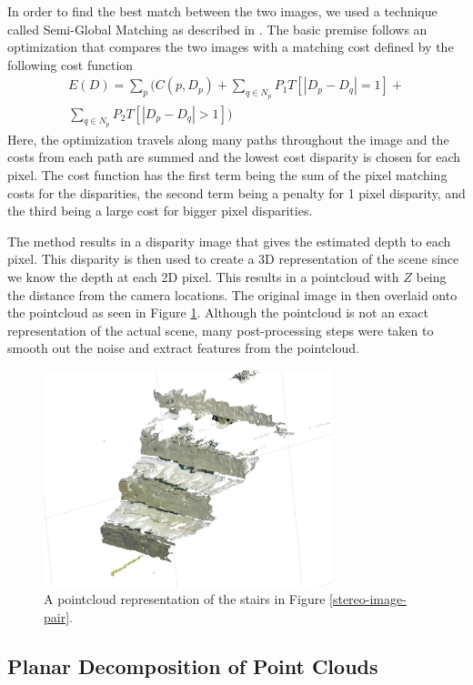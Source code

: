 In order to find the best match between the two images, we used a technique called Semi-Global Matching as described in \cite{1467526}. The basic premise follows an optimization that compares the two images with a matching cost defined by the following cost function
\begin{align*}
E(D) = \sum\limits_p(C(p,D_p)+\sum\limits_{q\in N_p}P_1T[|D_p-D_q|=1]+\\\sum\limits_{q\in N_p}P_2T[|D_p-D_q|>1])
\end{align*}
Here, the optimization travels along many paths throughout the image and the costs from each path are summed and the lowest cost disparity is chosen for each pixel. The cost function has the first term being the sum of the pixel matching costs for the disparities, the second term being a penalty for 1 pixel disparity, and the third being a large cost for bigger pixel disparities.

The method results in a disparity image that gives the estimated depth to each pixel. This disparity is then used to create a 3D representation of the scene since we know the depth at each 2D pixel. This results in a pointcloud with $Z$ being the distance from the camera locations. The original image in then overlaid onto the pointcloud as seen in Figure \ref{pointcloud-example}. Although the pointcloud is not an exact representation of the actual scene, many post-processing steps were taken to smooth out the noise and extract features from the pointcloud.
\begin{figure}[!h]
\centering
\includegraphics[width=3.3in]{Sections/Figures/example_stairs_pointcloud.jpg}
\caption{A pointcloud representation of the stairs in Figure \ref{stereo-image-pair}.}
\label{pointcloud-example}
\end{figure}

\subsection{Planar Decomposition of Point Clouds} \label{plane-section}

